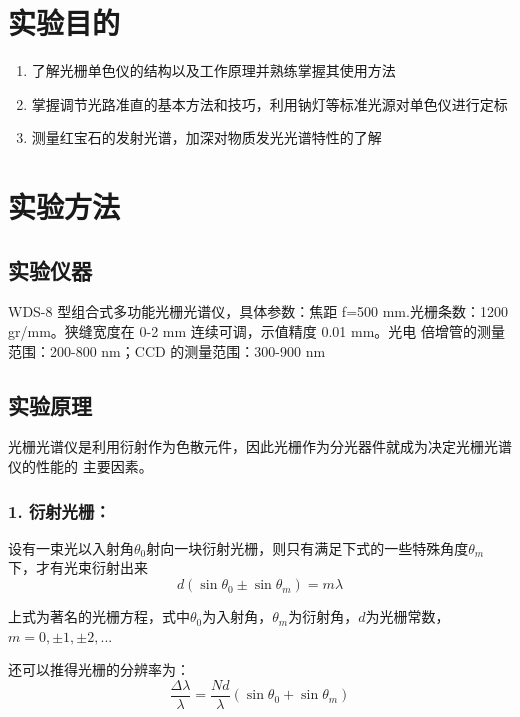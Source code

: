 \documentclass[utf8]{ctexart}
\begin{document}
	
	\section*{实验目的}
	\begin{enumerate}
		\item 
		了解光栅单色仪的结构以及工作原理并熟练掌握其使用方法
		\item 
		掌握调节光路准直的基本方法和技巧，利用钠灯等标准光源对单色仪进行定标
		\item 
		测量红宝石的发射光谱，加深对物质发光光谱特性的了解
	\end{enumerate}
	
	\section*{实验方法}
	\subsection*{实验仪器}
	WDS-8 型组合式多功能光栅光谱仪，具体参数：焦距 f=500 
	mm.光栅条数：1200 gr/mm。狭缝宽度在 0-2 mm 连续可调，示值精度 0.01 mm。光电
	倍增管的测量范围：200-800 nm；CCD 的测量范围：300-900 nm
	
	\subsection*{实验原理}
	光栅光谱仪是利用衍射作为色散元件，因此光栅作为分光器件就成为决定光栅光谱仪的性能的
	主要因素。
	\subsubsection*{1. 衍射光栅：}
	设有一束光以入射角$\theta_0$射向一块衍射光栅，则只有满足下式的一些特殊角度$\theta_m$下，才有光束衍射出来
	\begin{equation}
		d(\sin{\theta_0}\pm\sin{\theta_m})=m\lambda
	\end{equation}

	上式为著名的光栅方程，式中$\theta_0$为入射角，$\theta_m$为衍射角，$d$为光栅常数，$m=0,\pm1,\pm2,...$
	
	还可以推得光栅的分辨率为：
	\begin{equation}
		\frac{\Delta\lambda}{\lambda} = \frac{Nd}{\lambda}(\sin{\theta_0}+\sin{\theta_m})
	\end{equation}
\end{document}
